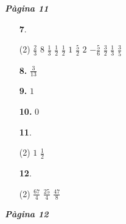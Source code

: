 \documentclass[a4paper, pdf, twoside]{book}
\begin{document}
\begin{multicols}{2}
{\textbf{\em Pàgina 11}} \hrulefill
\begin{enumerate}
\vspace{0.25cm}



 \item[\fontfamily{phv}\selectfont\color{blue}\textbf{7}. ]  \scalebox{0.6}{\simbolclau } 
 \begin{tasks}[column-sep=1em, item-indent=1.3333em](2)
	 \task $\frac {2}{3}$
	 \task $8$
	 \task $\frac {1}{3}$
	 \task $\frac {1}{2}$
	 \task $\frac {1}{2}$
	 \task $1$
	 \task $\frac {5}{2}$
	 \task $2$
	 \task $-\frac {5}{6}$
	 \task $\frac {3}{2}$
	 \task $\frac {1}{3}$
	 \task $\frac {3}{5}$
\end{tasks}
 \end{enumerate}
\begin{enumerate}
\vspace{0.25cm}
\item[\fontfamily{phv}\selectfont\color{blue}\textbf{8. }] 
$\frac {3}{13}$
\vspace{0.25cm}
\item[\fontfamily{phv}\selectfont\color{blue}\textbf{9. }] 
$1$
\vspace{0.25cm}
\item[\fontfamily{phv}\selectfont\color{blue}\textbf{10. }] 
$0$
\vspace{0.25cm}



 \item[\fontfamily{phv}\selectfont\color{blue}\textbf{11}. ] 
 \begin{tasks}[column-sep=1em, item-indent=1.3333em](2)
	 \task $1$
	 \task $\frac {1}{2}$
\end{tasks}
\vspace{0.25cm}



 \item[\fontfamily{phv}\selectfont\color{blue}\textbf{12}. ]  \scalebox{0.6}{\simbolclau } 
 \begin{tasks}[column-sep=1em, item-indent=1.3333em](2)
	 \task $\frac {67}{4}$
	 \task $\frac {25}{4}$
	 \task $\frac {47}{8}$
\end{tasks}
 \end{enumerate}
\vspace{0.3cm}


{\textbf{\em Pàgina 12}} \hrulefill
\begin{enumerate}
\vspace{0.25cm}



\end{enumerate}
\end{multicols}
\end{document}
